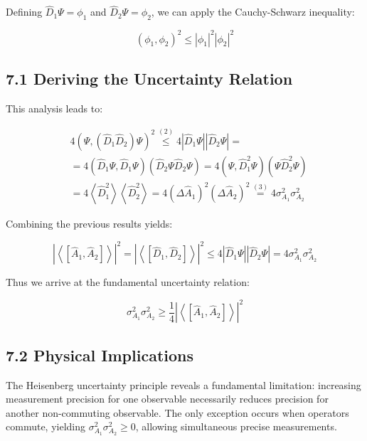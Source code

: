 \documentclass[italian]{HKNdocument}
\begin{document}
Defining $\hat{D}_{1} \Psi=\phi_{1}$ and $\hat{D}_{2} \Psi=\phi_{2}$, we can apply the Cauchy-Schwarz inequality:

\begin{equation*}
\left(\phi_{1}, \phi_{2}\right)^{2} \leq\left|\phi_{1}\right|^2\left|\phi_{2}\right|^2 \tag{7.14}
\end{equation*}


\subsection*{7.1 Deriving the Uncertainty Relation}
This analysis leads to:

\begin{align*}
& 4\left(\Psi,\left(\hat{D}_{1} \hat{D}_{2}\right) \Psi\right)^{2} \stackrel{(2)}{\leq} 4\left|\hat{D}_{1} \Psi\right|\left|\hat{D}_{2} \Psi\right|= \\
& =4\left(\hat{D}_{1} \Psi, \hat{D}_{1} \Psi\right)\left(\hat{D}_{2} \Psi \hat{D}_{2} \Psi\right)=4\left(\Psi, \hat{D}_{1}^{2} \Psi\right)\left(\Psi \hat{D}_{2}^{2} \Psi\right)  \tag{7.15}\\
& =4\left\langle\hat{D}_{1}^{2}\right\rangle\left\langle\hat{D}_{2}^{2}\right\rangle=4\left(\Delta \hat{A}_{1}\right)^{2}\left(\Delta \hat{A}_{2}\right)^{2} \stackrel{(3)}{=} 4 \sigma_{A_{1}}^{2} \sigma_{A_{2}}^{2}
\end{align*}

Combining the previous results yields:

\begin{equation*}
\left|\left\langle\left[\hat{A}_{1}, \hat{A}_{2}\right]\right\rangle\right|^{2}=\left|\left\langle\left[\hat{D}_{1}, \hat{D}_{2}\right]\right\rangle\right|^{2} \leq 4\left|\hat{D}_{1} \Psi\right|\left|\hat{D}_{2} \Psi\right|=4 \sigma_{A_{1}}^{2} \sigma_{A_{2}}^{2} \tag{7.16}
\end{equation*}

Thus we arrive at the fundamental uncertainty relation:

\begin{equation*}
\sigma_{A_{1}}^{2} \sigma_{A_{2}}^{2} \geq \frac{1}{4}\left|\left\langle\left[\hat{A}_{1}, \hat{A}_{2}\right]\right\rangle\right|^{2} \tag{7.17}
\end{equation*}

\subsection*{7.2 Physical Implications}
The Heisenberg uncertainty principle reveals a fundamental limitation: increasing measurement precision for one observable necessarily reduces precision for another non-commuting observable. The only exception occurs when operators commute, yielding $\sigma_{A_{1}}^{2} \sigma_{A_{2}}^{2} \geq 0$, allowing simultaneous precise measurements.
\end{document}

